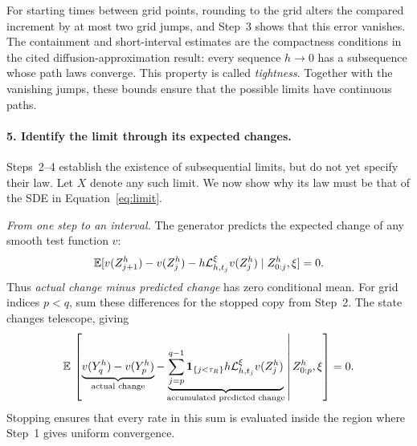 For starting times between grid points, rounding to the grid alters the compared increment by at most two grid jumps, and Step~3 shows that this error vanishes. The containment and short-interval estimates are the compactness conditions in the cited diffusion-approximation result: every sequence $h\to0$ has a subsequence whose path laws converge. This property is called \emph{tightness}. Together with the vanishing jumps, these bounds ensure that the possible limits have continuous paths.

\paragraph{5. Identify the limit through its expected changes.}
Steps~2--4 establish the existence of subsequential limits, but do not yet specify their law. Let $X$ denote any such limit. We now show why its law must be that of the SDE in Equation~\eqref{eq:limit}.

\emph{From one step to an interval.}
The generator predicts the expected change of any smooth test function $v$:
\begin{equation}\label{eq:conditional-test-increment}
 \mathbb E[v(Z^h_{j+1})-v(Z^h_j)-h\mathcal L_{h,t_j}^{\xi}v(Z_j^h)
       \mid Z^h_{0:j},\xi]=0.
\end{equation}
Thus \emph{actual change minus predicted change} has zero conditional mean. For grid indices $p<q$, sum these differences for the stopped copy from Step~2. The state changes telescope, giving
\begin{equation}\label{eq:stopped-expected-change}
 \mathbb E\,\left[
 \underbrace{v(Y_q^h)-v(Y_p^h)}_{\mbox{\scriptsize actual change}}
 -\underbrace{\sum_{j=p}^{q-1}\boldsymbol 1_{\{j<\tau_R\}}
       h\mathcal L_{h,t_j}^{\xi}v(Z_j^h)}_{\mbox{\scriptsize accumulated predicted change}}
 \,\middle|\,Z^h_{0:p},\xi\right]=0.
\end{equation}
Stopping ensures that every rate in this sum is evaluated inside the region where Step~1 gives uniform convergence.

